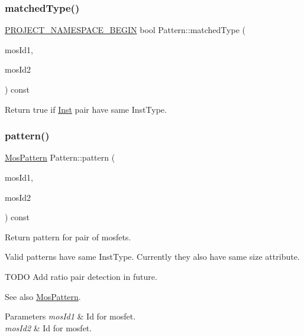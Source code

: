 \subsubsection{\texorpdfstring{matched\+Type()}{matchedType()}}
{\footnotesize\ttfamily \hyperlink{namespace_8h_ae48726a24dab2034454cf6d79e531eb8}{P\+R\+O\+J\+E\+C\+T\+\_\+\+N\+A\+M\+E\+S\+P\+A\+C\+E\+\_\+\+B\+E\+G\+IN} bool Pattern\+::matched\+Type (\begin{DoxyParamCaption}\item[{\hyperlink{type_8h_a581e8093e28e7362f2b6937296190676}{Index\+Type}}]{mos\+Id1,  }\item[{\hyperlink{type_8h_a581e8093e28e7362f2b6937296190676}{Index\+Type}}]{mos\+Id2 }\end{DoxyParamCaption}) const\hspace{0.3cm}{\ttfamily [private]}}



Return true if \hyperlink{classInst}{Inst} pair have same Inst\+Type. 

\mbox{\label{classPattern_a1214e024706aff22e44bb4f4266d8e97}} 
\subsubsection{\texorpdfstring{pattern()}{pattern()}}
{\footnotesize\ttfamily \hyperlink{type_8h_af19eddb079bfea723256710b029c38e8}{Mos\+Pattern} Pattern\+::pattern (\begin{DoxyParamCaption}\item[{\hyperlink{type_8h_a581e8093e28e7362f2b6937296190676}{Index\+Type}}]{mos\+Id1,  }\item[{\hyperlink{type_8h_a581e8093e28e7362f2b6937296190676}{Index\+Type}}]{mos\+Id2 }\end{DoxyParamCaption}) const}



Return pattern for pair of mosfets. 

Valid patterns have same Inst\+Type. Currently they also have same size attribute.

T\+O\+DO Add ratio pair detection in future. \begin{DoxySeeAlso}{See also}
\hyperlink{type_8h_af19eddb079bfea723256710b029c38e8}{Mos\+Pattern}. 
\end{DoxySeeAlso}

\begin{DoxyParams}{Parameters}
{\em mos\+Id1} & Id for mosfet. \\
\hline
{\em mos\+Id2} & Id for mosfet. \\
\hline
\end{DoxyParams}
\mbox{\label{classPattern_ab1334774aab3ce88b1d2d799e31f3bd9}} 
